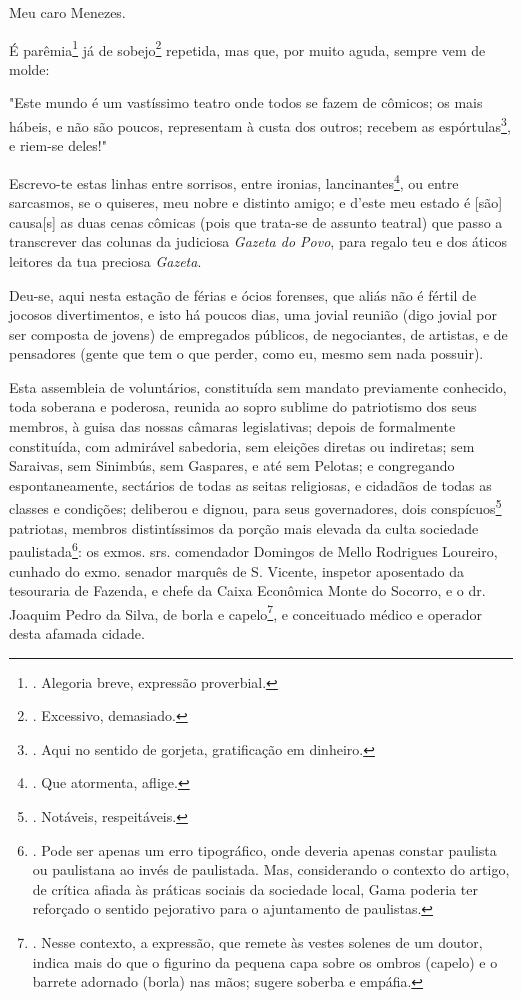 Meu caro Menezes.

É parêmia\footnote{. Alegoria breve, expressão proverbial.} já de
sobejo\footnote{. Excessivo, demasiado.} repetida, mas que, por muito
aguda, sempre vem de molde:

"Este mundo é um vastíssimo teatro onde todos se fazem de cômicos; os
mais hábeis, e não são poucos, representam à custa dos outros; recebem
as espórtulas\footnote{. Aqui no sentido de gorjeta, gratificação em
  dinheiro.}, e riem-se deles!"

Escrevo-te estas linhas entre sorrisos, entre ironias,
lancinantes\footnote{. Que atormenta, aflige.}, ou entre sarcasmos, se o
quiseres, meu nobre e distinto amigo; e d'este meu estado é {[}são{]}
causa{[}s{]} as duas cenas cômicas (pois que trata-se de assunto
teatral) que passo a transcrever das colunas da judiciosa \emph{Gazeta
do Povo}, para regalo teu e dos áticos leitores da tua preciosa
\emph{Gazeta}.

Deu-se, aqui nesta estação de férias e ócios forenses, que aliás não é
fértil de jocosos divertimentos, e isto há poucos dias, uma jovial
reunião (digo jovial por ser composta de jovens) de empregados públicos,
de negociantes, de artistas, e de pensadores (gente que tem o que
perder, como eu, mesmo sem nada possuir).

Esta assembleia de voluntários, constituída sem mandato previamente
conhecido, toda soberana e poderosa, reunida ao sopro sublime do
patriotismo dos seus membros, à guisa das nossas câmaras legislativas;
depois de formalmente constituída, com admirável sabedoria, sem eleições
diretas ou indiretas; sem Saraivas, sem Sinimbús, sem Gaspares, e até
sem Pelotas; e congregando espontaneamente, sectários de todas as seitas
religiosas, e cidadãos de todas as classes e condições; deliberou e
dignou, para seus governadores, dois conspícuos\footnote{. Notáveis,
  respeitáveis.} patriotas, membros distintíssimos da porção mais
elevada da culta sociedade paulistada\footnote{. Pode ser apenas um erro
  tipográfico, onde deveria apenas constar paulista ou paulistana ao
  invés de paulistada. Mas, considerando o contexto do artigo, de
  crítica afiada às práticas sociais da sociedade local, Gama poderia
  ter reforçado o sentido pejorativo para o ajuntamento de paulistas.}:
os exmos. srs. comendador Domingos de Mello Rodrigues Loureiro, cunhado
do exmo. senador marquês de S. Vicente, inspetor aposentado da
tesouraria de Fazenda, e chefe da Caixa Econômica Monte do Socorro, e o
dr. Joaquim Pedro da Silva, de borla e capelo\footnote{. Nesse contexto,
  a expressão, que remete às vestes solenes de um doutor, indica mais do
  que o figurino da pequena capa sobre os ombros (capelo) e o barrete
  adornado (borla) nas mãos; sugere soberba e empáfia.}, e conceituado
médico e operador desta afamada cidade.

